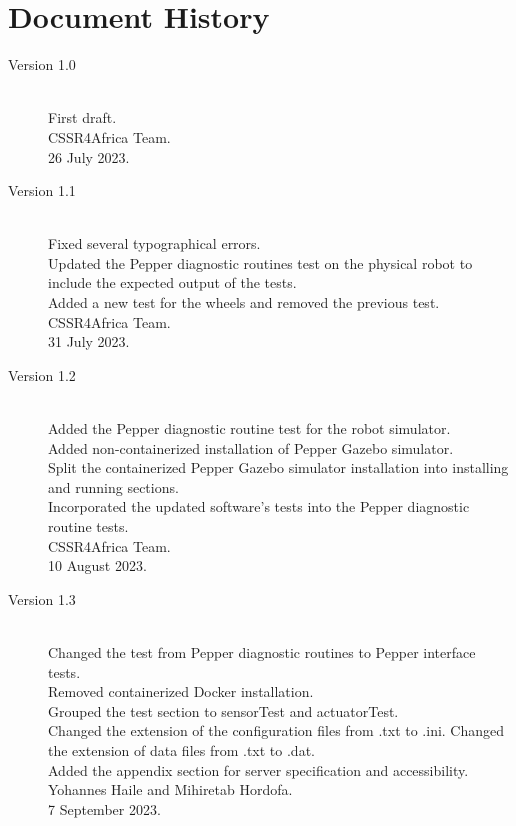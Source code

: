\documentclass{CSSRforAfrica}
\begin{document}
{\pagebreak
\section*{Document History}
\label{document_history}

\begin{description}

\item [Version 1.0]~\\
First draft. \\
CSSR4Africa Team. \\ %
26 July 2023. %

\item [Version 1.1]~\\
Fixed several typographical errors.\\
Updated the Pepper diagnostic routines test on the physical robot to include the expected output of the tests.\\
Added a new test for the wheels and removed the previous test.\\
CSSR4Africa Team.\\
31 July 2023.

\item [Version 1.2]~\\
Added the Pepper diagnostic routine test for the robot simulator.\\
Added non-containerized installation of Pepper Gazebo simulator.\\
Split the containerized Pepper Gazebo simulator installation into installing and running sections.\\
Incorporated the updated software's tests into the Pepper diagnostic routine tests.\\
CSSR4Africa Team.\\
10 August 2023.

\item [Version 1.3]~\\
Changed the test from Pepper diagnostic routines to Pepper interface tests.\\
Removed containerized Docker installation.\\
Grouped the test section to sensorTest and actuatorTest.\\
Changed the extension of the configuration files from .txt to .ini. Changed the extension of data files from .txt to .dat. \\
Added the appendix section for server specification and accessibility.\\
Yohannes Haile and Mihiretab Hordofa.\\
7 September 2023.


\end{description}}
\end{document}
